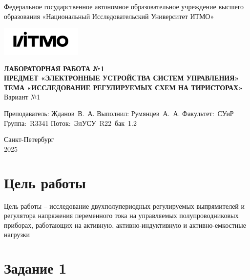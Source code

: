 \documentclass[a4paper, 12pt]{article}
\begin{document}
    \begin{titlepage}

        \begin{center}
        Федеральное государственное автономное образовательное учреждение высшего образования
        «Национальный Исследовательский Университет ИТМО»
        \vfill
        
        \includegraphics[width=0.3\textwidth]{itmo.png} %

        {\large\bf ЛАБОРАТОРНАЯ РАБОТА №1}\\
        {\large\bf ПРЕДМЕТ «ЭЛЕКТРОННЫЕ УСТРОЙСТВА СИСТЕМ УПРАВЛЕНИЯ»}\\
        {\large\bf ТЕМА «ИССЛЕДОВАНИЕ РЕГУЛИРУЕМЫХ СХЕМ НА ТИРИСТОРАХ»}\\
        Вариант №1
        \vfill

        \begin{flushright}
            \begin{minipage}{.45\textwidth}
            {
                \hbox{Преподаватель:}
                \hbox{Жданов В. А.}
                \hbox{}
                \hbox{Выполнил:}
                \hbox{Румянцев А. А.}
                \hbox{}
                \hbox{Факультет: СУиР}
                \hbox{Группа: R3341}
                \hbox{Поток: ЭлУСУ R22 бак 1.2}
            }
            \end{minipage}
        \end{flushright}
        \vfill
  
        Санкт-Петербург\\
        2025
        \end{center}
    \end{titlepage}
    
    \tableofcontents

    \newpage
    \section{Цель работы}
    Цель работы -- исследование двухполупериодных регулируемых выпрямителей и регулятора
    напряжения переменного тока на управляемых полупроводниковых приборах, работающих на
    активную, активно-индуктивную и активно-емкостные нагрузки


    \section{Задание 1}
\end{document}

